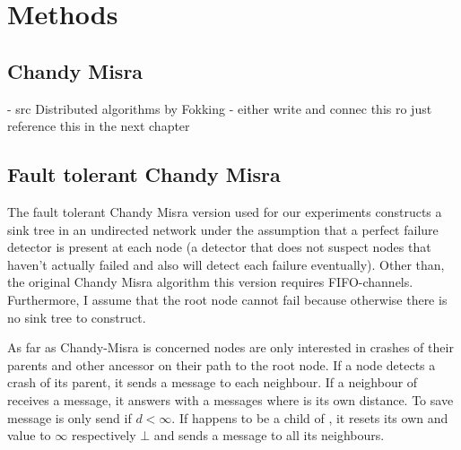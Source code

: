 \section{Methods}  %

\subsection{Chandy Misra}
 - src Distributed algorithms by Fokking
 - either write and connec this ro just reference this in the next chapter
\subsection {Fault tolerant Chandy Misra}
  The fault tolerant Chandy Misra version used for our experiments constructs a sink tree in an undirected network under the assumption that a perfect failure detector is present at each node (a detector that does not suspect nodes that haven't actually failed and also will detect each failure eventually). 
  Other than, the original Chandy Misra algorithm this version requires FIFO-channels.
  Furthermore, I assume that the root node cannot fail because otherwise there is no sink tree to construct.
  
  As far as Chandy-Misra is concerned nodes are only interested in crashes of their parents and other ancessor on their path to the root node.
  If a node  detects a crash of its parent, it sends a  message to each neighbour. 
  If a neighbour  of  receives a  message, it answers with a  messages where  is its own distance. 
  To save message  is only send if $d < \infty $.
  If  happens to be a child of , it resets its own  and  value to $\infty$ respectively $\bot$ and sends a  message to all its neighbours.
  
